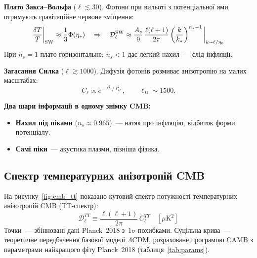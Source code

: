 \documentclass[12pt, a4paper]{article}
\begin{document}
\textbf{Плато Закса--Вольфа} ($\ell \lesssim 30$).
Фотони при вильоті з потенціальної ями отримують гравітаційне червоне зміщення:
\begin{equation*}
  \frac{\delta T}{T}\bigg|_{\rm SW} \approx \frac{1}{3}\Phi(\eta_*)
  \quad\Rightarrow\quad
  \mathcal{D}_\ell^{\rm SW} \approx
  \frac{A_s}{9}\,\frac{\ell(\ell+1)}{2\pi}
  \left(\frac{k}{k_*}\right)^{n_s-1}\bigg|_{k \sim \ell/\eta_0}
\end{equation*}
При $n_s = 1$ плато горизонтальне; $n_s < 1$ дає легкий нахил~--- слід інфляції.

\textbf{Загасання Силка} ($\ell \gtrsim 1000$).
Дифузія фотонів розмиває анізотропію на малих масштабах:
\begin{equation*}
  C_\ell \propto e^{-\ell^2/\ell_D^2}, \qquad \ell_D \sim 1500.
\end{equation*}

\begin{keybox}
\textbf{Два шари інформації в одному знімку CMB:}
\begin{itemize}[nosep]
  \item \textbf{Нахил під піками} ($n_s \approx 0.965$)~--- натяк про інфляцію,
        відбиток форми потенціалу.
  \item \textbf{Самі піки}~--- акустика плазми, пізніша фізика.
\end{itemize}
\end{keybox}

\subsection{Спектр температурних анізотропій CMB}

На рисунку~\ref{fig:cmb_tt} показано кутовий спектр потужності температурних
анізотропій CMB (TT-спектр):
\begin{equation*}
  \mathcal{D}_\ell^{TT} \equiv \frac{\ell(\ell+1)}{2\pi}\,C_\ell^{TT}
  \quad [\mu\mathrm{K}^2]
\end{equation*}
Точки~--- збінновані дані Planck~2018 з~$1\sigma$ похибками.
Суцільна крива~--- теоретичне передбачення базової моделі $\Lambda$CDM,
розраховане програмою CAMB з параметрами найкращого фіту Planck~2018
(таблиця~\ref{tab:params}).
\end{document}
